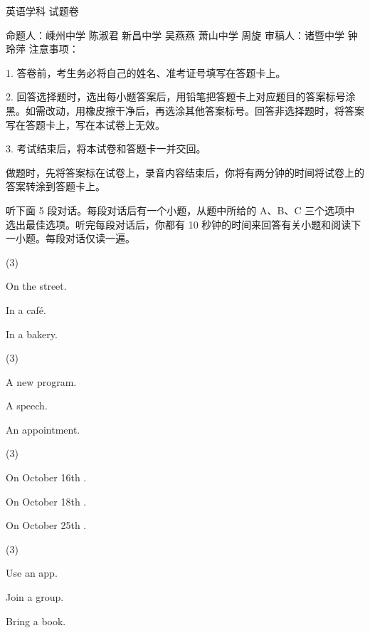 \documentclass{英语试卷}
\begin{document}
\par 英语学科 试题卷\par
\par 命题人：嵊州中学 陈淑君 新昌中学 吴燕燕 萧山中学 周旋 审稿人：诸暨中学 钟玲萍 注意事项：\par
\par 1. 答卷前，考生务必将自己的姓名、准考证号填写在答题卡上。\par
\par 2. 回答选择题时，选出每小题答案后，用铅笔把答题卡上对应题目的答案标号涂黑。如需改动，用橡皮擦干净后，再选涂其他答案标号。回答非选择题时，将答案写在答题卡上，写在本试卷上无效。\par
\par 3. 考试结束后，将本试卷和答题卡一并交回。\par
{}
\par 做题时，先将答案标在试卷上，录音内容结束后，你将有两分钟的时间将试卷上的答案转涂到答题卡上。\par
{}
\par 听下面 5 段对话。每段对话后有一个小题，从题中所给的 A、B、C 三个选项中选出最佳选项。听完每段对话后，你都有 10 秒钟的时间来回答有关小题和阅读下一小题。每段对话仅读一遍。\par
{}
\begin{choices}(3)
  \item On the street.
  \item In a café.
  \item In a bakery.
\end{choices}
\begin{choices}(3)
  \item A new program.
  \item A speech.
  \item An appointment.
\end{choices}
\begin{choices}(3)
  \item On October 16th .
  \item On October 18th .
  \item On October 25th .
\end{choices}
\begin{choices}(3)
  \item Use an app.
  \item Join a group.
  \item Bring a book.
\end{choices}
\end{document}
